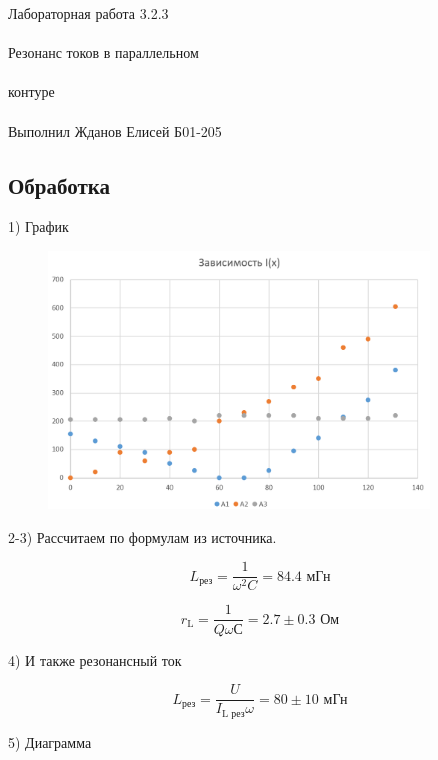\documentclass{astroedu-lab}
\begin{document}
\begin{problem}{\huge Лабораторная работа 3.2.3\\\\Резонанс токов в параллельном\\\\контуре\\\\Выполнил Жданов Елисей Б01-205}
\newpage

\subsection{Обработка}

1) График

\begin{figure}[!h]
	\centering
	\includegraphics[width=0.9\textwidth]{Ix.png}
	\label{fig:boiler}
\end{figure}

2-3) Рассчитаем по формулам из источника.

\begin{equation}
	L_\text{рез} = \frac{1}{\omega^2 C} = 84.4 \text{ мГн}
\end{equation}

\begin{equation}
	r_\text{L} = \frac{1}{Q \omega С} = 2.7 \pm 0.3 \text{ Ом}
\end{equation}

4) И также резонансный ток

\begin{equation}
	L_\text{рез} = \frac{U}{I_\text{L рез} \omega} = 80 \pm 10 \text{ мГн}
\end{equation}

\newpage

5) Диаграмма


\end{problem}
\end{document}
